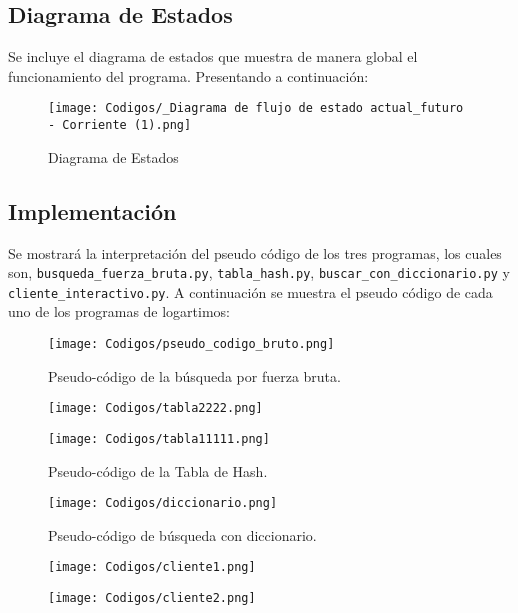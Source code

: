 \documentclass[12pt, twoside]{article}
\begin{document}
\subsection{Diagrama de Estados}
Se incluye el diagrama de estados que muestra de manera global el funcionamiento del programa. Presentando a continuación:
\begin{figure}[H]
    \centering
    \texttt{[image: Codigos/\_Diagrama de flujo de estado actual\_futuro - Corriente (1).png]}
    \caption{Diagrama de Estados}
    \label{fig:enter-label}
\end{figure}


\subsection{Implementación}
Se mostrará la interpretación del pseudo código de los tres programas, los cuales son, \texttt{busqueda\_fuerza\_bruta.py}, \texttt{tabla\_hash.py}, \texttt{buscar\_con\_diccionario.py} y
\newline
\texttt{cliente\_interactivo.py}. A continuación se muestra el pseudo código de cada uno de los programas de logartimos:
\begin{figure}[H]
  \centering
  \texttt{[image: Codigos/pseudo\_codigo\_bruto.png]}
  \caption{Pseudo-código de la búsqueda por fuerza bruta.}
  \label{fig:pseudocodigo}
\end{figure}

\begin{figure}[H]
    \centering
    \texttt{[image: Codigos/tabla2222.png]}
\end{figure}
\begin{figure}[H]
  \centering
  \texttt{[image: Codigos/tabla11111.png]}
  \caption{Pseudo-código de la Tabla de Hash.}
  \label{fig:pseudocodigo}
\end{figure}


\begin{figure}[H]
  \centering
  \texttt{[image: Codigos/diccionario.png]}
  \caption{Pseudo-código de búsqueda con diccionario.}
  \label{fig:pseudocodigo}
\end{figure}

\begin{figure}[H]
    \centering
    \texttt{[image: Codigos/cliente1.png]}
\end{figure}
\begin{figure}
    \centering
    \texttt{[image: Codigos/cliente2.png]}
\end{figure}
\end{document}
